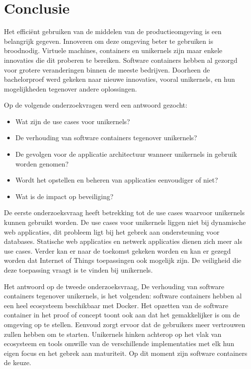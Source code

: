 \chapter{Conclusie}
\label{ch:conclusie}

Het efficiënt gebruiken van de middelen van de productieomgeving is een belangrijk gegeven. Innoveren om deze omgeving beter te gebruiken is broodnodig. Virtuele machines, containers en unikernels zijn maar enkele innovaties die dit proberen te bereiken. Software containers hebben al gezorgd voor grotere veranderingen binnen de meeste bedrijven. Doorheen de bachelorproef werd gekeken naar nieuwe innovaties, vooral unikernels, en hun mogelijkheden tegenover andere oplossingen.

Op de volgende onderzoekvragen werd een antwoord gezocht:

\begin{itemize}  
\item Wat zijn de use cases voor unikernels?
\item De verhouding van software containers tegenover unikernels?
\item De gevolgen voor de applicatie architectuur wanneer unikernels in gebruik worden genomen?
\item Wordt het opstellen en beheren van applicaties eenvoudiger of niet?
\item Wat is de impact op beveiliging?
\end{itemize}

De eerste onderzoeksvraag heeft betrekking tot de use cases waarvoor unikernels kunnen gebruikt worden. De use cases voor unikernels liggen niet bij dynamische web applicaties, dit probleem ligt bij het gebrek aan ondersteuning voor databases. Statische web applicaties en netwerk applicaties dienen zich meer als use cases. Verder kan er naar de toekomst gekeken worden en kan er gezegd worden dat Internet of Things toepassingen ook mogelijk zijn. De veiligheid die deze toepassing vraagt is te vinden bij unikernels.

Het antwoord op de tweede onderzoeksvraag, De verhouding van software containers tegenover unikernels, is het volgenden: software containers hebben al een heel ecosysteem beschikbaar met Docker. Het opzetten van de software container in het proof of concept toont ook aan dat het gemakkelijker is om de omgeving op te stellen. Eenvoud zorgt ervoor dat de gebruikers meer vertrouwen zullen hebben om te starten. Unikernels hinken achterop op het vlak van ecosysteem en tools omwille van de verschillende implementaties met elk hun eigen focus en het gebrek aan maturiteit. Op dit moment zijn software containers de keuze.

